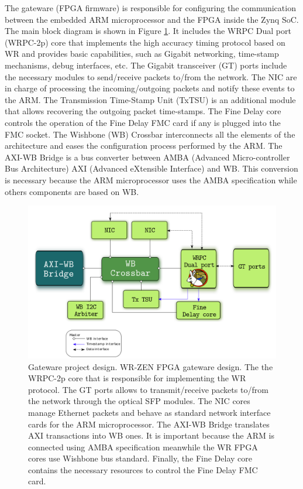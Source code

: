 The gateware (FPGA firmware) is responsible for configuring the communication between the embedded ARM microprocessor and the FPGA inside the Zynq SoC. 
The main block diagram is shown in Figure \ref{fig:gateware_first_level}. 
It includes the WRPC Dual port (WRPC-2p) core that implements the high accuracy timing protocol based on WR and provides basic capabilities, such as Gigabit networking, time-stamp mechanisms, debug interfaces, etc. The Gigabit transceiver (GT) ports include the necessary modules to send/receive packets to/from the network. The NIC are in charge of processing the incoming/outgoing
packets and notify these events to the ARM. The Transmission Time-Stamp Unit
(TxTSU) is an additional module that allows recovering the outgoing packet
time-stamps. The Fine Delay core controls the operation of the Fine Delay FMC
card if any is plugged into the FMC socket. The Wishbone (WB) Crossbar
interconnects all the elements of the architecture and eases the configuration
process performed by the ARM. The AXI-WB Bridge is a bus converter between AMBA (Advanced Micro-controller Bus Architecture)
AXI (Advanced eXtensible Interface) and WB. This conversion is necessary because the ARM microprocessor
uses the AMBA specification while others components are based on WB.

\begin{figure}[H] \centering
	\includegraphics[scale=0.4]{img/gateware_first_level} \caption{Gateware
	project design. WR-ZEN FPGA gateware design. The the WRPC-2p core that is responsible for implementing the WR protocol. The GT ports allows to transmit/receive packets to/from the network through the optical SFP modules. The NIC cores manage Ethernet packets and behave as standard network interface cards for the ARM microprocessor. The AXI-WB Bridge translates AXI transactions into WB ones. It is important because the ARM is connected using AMBA specification meanwhile the WR FPGA cores use Wishbone bus standard. Finally, the Fine Delay core contains the necessary resources to control the Fine Delay FMC card.} \label{fig:gateware_first_level} 
\end{figure}

